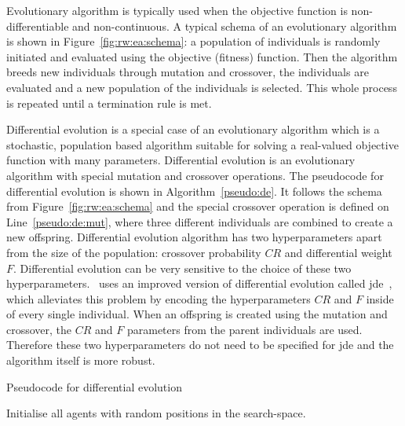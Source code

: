 \documentclass[12pt,a4paper]{report}
\begin{document}
Evolutionary algorithm is typically used when the objective function is non-differentiable and non-continuous. A typical schema of an evolutionary algorithm is shown in Figure~\ref{fig:rw:ea:schema}: a population of individuals is randomly initiated and evaluated using the objective (fitness) function. Then the algorithm breeds new individuals through mutation and crossover, the individuals are evaluated and a new population of the individuals is selected. This whole process is repeated until a termination rule is met.


Differential evolution is a special case of an evolutionary algorithm which is a stochastic, population based algorithm suitable for solving a real-valued objective function with many parameters. Differential evolution is an evolutionary algorithm with special mutation and crossover operations. The pseudocode for differential evolution is shown in Algorithm~\ref{pseudo:de}. It follows the schema from Figure~\ref{fig:rw:ea:schema} and the special crossover operation is defined on Line~\ref{pseudo:de:mut}, where three different individuals are combined to create a new offspring. Differential evolution algorithm has two hyperparameters apart from the size of the population: crossover probability $CR$ and differential weight $F$. Differential evolution can be very sensitive to the choice of these two hyperparameters.~\citep{fukui2013evolutionary} uses an improved version of differential evolution called \acf{jde}~\citep{brest2006self}, which alleviates this problem by encoding the hyperparameters $CR$ and $F$ inside of every single individual. When an offspring is created using the mutation and crossover, the $CR$ and $F$ parameters from the parent individuals are used. Therefore these two hyperparameters do not need to be specified for \ac{jde} and the algorithm itself is more robust.

\begin{algorithm}[t]
\caption{Pseudocode for differential evolution} \label{pseudo:de}
\DontPrintSemicolon
\LinesNumbered
{}
Initialise all agents with random positions in the search-space.\;
\end{algorithm} 
\end{document}
